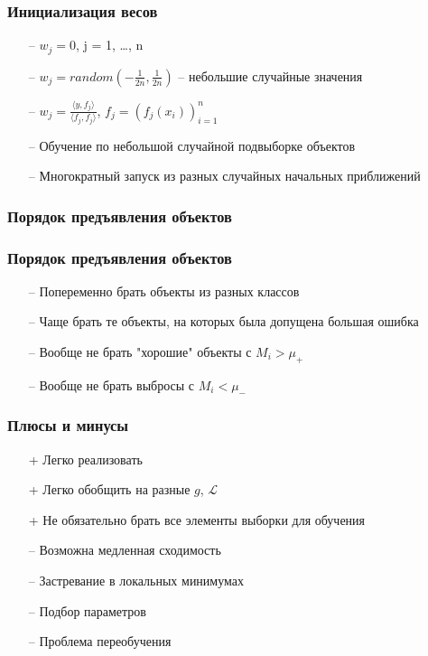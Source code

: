 \documentclass[12pt]{beamer}
\begin{document}
\begin{frame}\frametitle{Инициализация весов}
\begin{itemize}
\item[--] $w_j = 0$, j = 1, \dots, n
\item[--] $w_j = random(-\frac{1}{2n}, \frac{1}{2n})$ -- небольшие случайные значения
\item[--] $w_j = \frac{\langle y, f_j \rangle}{\langle f_j, f_j \rangle}$, $f_j = (f_j(x_i))_{i = 1}^n$
\item[--] Обучение по небольшой случайной подвыборке объектов
\item[--] Многократный запуск из разных случайных начальных приближений
\end{itemize}

\end{frame}

\begin{frame}\frametitle{Порядок предъявления объектов}

\end{frame}

\begin{frame}\frametitle{Порядок предъявления объектов}
\begin{itemize}
\item[--] Попеременно брать объекты из разных классов
\item[--] Чаще брать те объекты, на которых была допущена большая ошибка
\item[--] Вообще не брать "хорошие" объекты с $M_i > \mu_+$
\item[--] Вообще не брать выбросы с $M_i < \mu_-$
\end{itemize}
\end{frame}


\begin{frame}\frametitle{Плюсы и минусы}
\begin{itemize}
\item[+] Легко реализовать
\item[+] Легко обобщить на разные $g$, $\mathcal{L}$
\item[+] Не обязательно брать все элементы выборки для обучения
\end{itemize}
\begin{itemize}
\item[--] Возможна медленная сходимость
\item[--] Застревание в локальных минимумах
\item[--] Подбор параметров
\item[--] Проблема переобучения
\end{itemize}
\end{frame}
\end{document}
